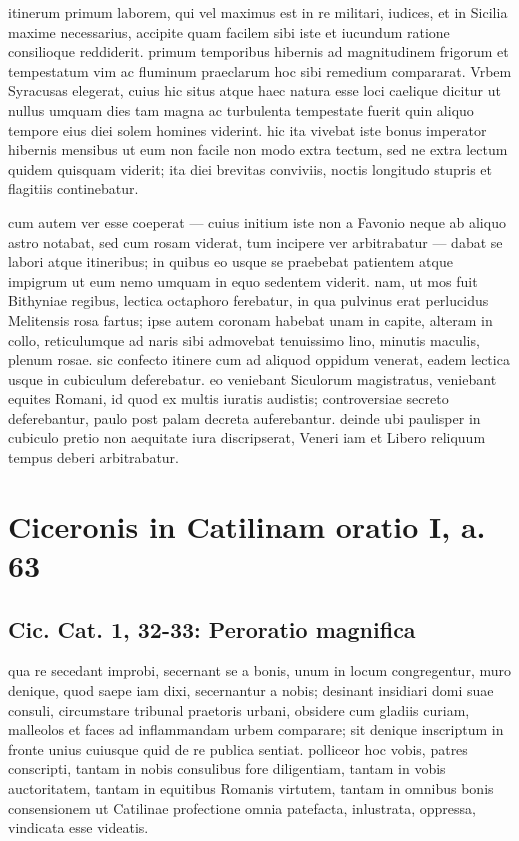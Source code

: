 itinerum primum laborem, qui vel maximus est in re militari, iudices, et in Sicilia maxime necessarius, accipite quam facilem sibi iste et iucundum ratione consilioque reddiderit. primum temporibus hibernis ad magnitudinem frigorum et tempestatum vim ac fluminum praeclarum hoc sibi remedium compararat. Vrbem Syracusas elegerat, cuius hic situs atque haec natura esse loci caelique dicitur ut nullus umquam dies tam magna ac turbulenta tempestate fuerit quin aliquo tempore eius diei solem homines viderint. hic ita vivebat iste bonus imperator hibernis mensibus ut eum non facile non modo extra tectum, sed ne extra lectum quidem quisquam viderit; ita diei brevitas conviviis, noctis longitudo stupris et flagitiis continebatur.

cum autem ver esse coeperat — cuius initium iste non a Favonio neque ab aliquo astro notabat, sed cum rosam viderat, tum incipere ver arbitrabatur — dabat se labori atque itineribus; in quibus eo usque se praebebat patientem atque impigrum ut eum nemo umquam in equo sedentem viderit. nam, ut mos fuit Bithyniae regibus, lectica octaphoro ferebatur, in qua pulvinus erat perlucidus Melitensis rosa fartus; ipse autem coronam habebat unam in capite, alteram in collo, reticulumque ad naris sibi admovebat tenuissimo lino, minutis maculis, plenum rosae. sic confecto itinere cum ad aliquod oppidum venerat, eadem lectica usque in cubiculum deferebatur. eo veniebant Siculorum magistratus, veniebant equites Romani, id quod ex multis iuratis audistis; controversiae secreto deferebantur, paulo post palam decreta auferebantur. deinde ubi paulisper in cubiculo pretio non aequitate iura discripserat, Veneri iam et Libero reliquum tempus deberi arbitrabatur.

\section*{Ciceronis in Catilinam oratio I, a. 63}

\subsection*{Cic. Cat. 1, 32-33: Peroratio magnifica}

qua re secedant improbi, secernant se a bonis, unum in locum congregentur, muro denique, quod saepe iam dixi, secernantur a nobis; desinant insidiari domi suae consuli, circumstare tribunal praetoris urbani, obsidere cum gladiis curiam, malleolos et faces ad inflammandam urbem comparare; sit denique inscriptum in fronte unius cuiusque quid de re publica sentiat. polliceor hoc vobis, patres conscripti, tantam in nobis consulibus fore diligentiam, tantam in vobis auctoritatem, tantam in equitibus Romanis virtutem, tantam in omnibus bonis consensionem ut Catilinae profectione omnia patefacta, inlustrata, oppressa, vindicata esse videatis.

